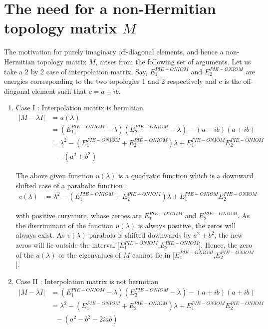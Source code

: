 \chapter{The need for a non-Hermitian topology matrix $M$}

The motivation for purely imaginary off-diagonal elements, and hence a non-Hermitian
topology matrix $M$, arises from the following
set of arguments. Let us take a 2 by 2 case of interpolation matrix.
Say, $E^{PIE-ONIOM}_1$ and $E^{PIE-ONIOM}_2$ are energies corresponding to the two
topologies 1 and 2 respectively and c is the off-diagonal element such that
$c = a \pm ib$.

\begin{enumerate}
\item Case I : Interpolation matrix is hermitian
\begin{equation}\label{eq2}
\left.\begin{aligned}
|M-\lambda I| &     =  u(\lambda)\\
              &     =  (E^{PIE-ONIOM}_1-\lambda)(E^{PIE-ONIOM}_2-\lambda) - (a-ib)(a+ib)\\
              &     =  \lambda^2 -(E^{PIE-ONIOM}_1 + E^{PIE-ONIOM}_2)\lambda + E^{PIE-ONIOM}_1E^{PIE-ONIOM}_2\\
              &~~~  - (a^2+b^2)
\end{aligned}\right.
\end{equation}

The above given function $u(\lambda)$ is a quadratic function which is a downward shifted
case of a parabolic function :
\begin{equation}\label{eq3}
\left.\begin{aligned}
v(\lambda) &     =  \lambda^2 -(E^{PIE-ONIOM}_1 + E^{PIE-ONIOM}_2)\lambda + E^{PIE-ONIOM}_1E^{PIE-ONIOM}_2
\end{aligned}\right.
\end{equation}

with positive curvature,
whose zeroes are $E^{PIE-ONIOM}_1$ and $E^{PIE-ONIOM}_2$. As the discriminant of the function
$u(\lambda)$ is always positive, the zeros will always exist. As $v(\lambda)$ parabola is
shifted downwards by $a^2+b^2$, the new zeros will lie outside the interval
[$E^{PIE-ONIOM}_1$,$E^{PIE-ONIOM}_2$]. Hence, the zero of the $u(\lambda)$ or the eigenvalues of $M$
cannot lie in [$E^{PIE-ONIOM}_1$,$E^{PIE-ONIOM}_2$].

\item Case II : Interpolation matrix is not hermitian
\begin{equation}\label{eq4}
\left.\begin{aligned}
|M-\lambda I| &     =  (E^{PIE-ONIOM}_1-\lambda)(E^{PIE-ONIOM}_2-\lambda) - (a+ib)(a+ib)\\
              &     =  \lambda^2 -(E^{PIE-ONIOM}_1 + E^{PIE-ONIOM}_2)\lambda + E^{PIE-ONIOM}_1E^{PIE-ONIOM}_2\\
              &     ~~~- (a^2-b^2-2iab)
\end{aligned}\right.
\end{equation}


\end{enumerate}
